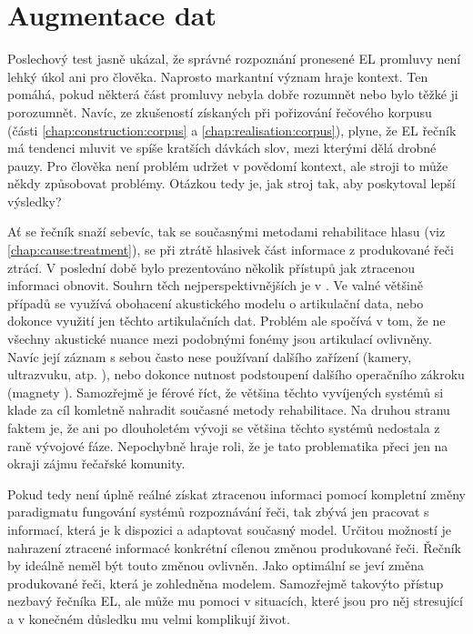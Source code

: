 \section{Augmentace dat}
\label{chap:realisation:augmentation}

Poslechový test jasně ukázal, že správné rozpoznání pronesené EL promluvy není lehký úkol ani pro člověka. Naprosto markantní význam hraje kontext. Ten pomáhá, pokud některá část promluvy nebyla dobře rozumnět nebo bylo těžké ji porozumnět. Navíc, ze zkušeností získaných při pořizování řečového korpusu (části \ref{chap:construction:corpus} a \ref{chap:realisation:corpus}), plyne, že EL řečník má tendenci mluvit ve spíše kratších dávkách slov, mezi kterými dělá drobné pauzy. Pro člověka není problém udržet v povědomí kontext, ale stroji to může někdy způsobovat problémy. Otázkou tedy je, jak  stroj tak, aby poskytoval lepší výsledky?

Ať se řečník snaží sebevíc, tak se současnými metodami rehabilitace hlasu (viz \ref{chap:cause:treatment}), se při ztrátě hlasivek část informace z produkované řeči ztrácí. V poslední době bylo prezentováno několik přístupů jak ztracenou informaci obnovit. Souhrn těch nejperspektivnějších je v \cite{Denby2010}. Ve valné většině případů se využívá obohacení akustického modelu o artikulační data, nebo dokonce využití jen těchto artikulačních dat. \cite{Hofe2013} Problém ale spočívá v tom, že ne všechny akustické nuance mezi podobnými fonémy jsou artikulací ovlivněny. Navíc její záznam s sebou často nese používaní dalšího zařízení (kamery, ultrazvuku, atp. \cite{Hueber2010}), nebo dokonce nutnost podstoupení dalšího operačního zákroku (magnety \cite{Hofe2011}). Samozřejmě je férové říct, že většina těchto vyvíjených systémů si klade za cíl komletně nahradit současné metody rehabilitace. Na druhou stranu faktem je, že ani po dlouholetém vývoji se většina těchto systémů nedostala z raně vývojové fáze. Nepochybně hraje roli, že je tato problematika přeci jen na okraji zájmu řečařské komunity.

Pokud tedy není úplně reálné získat ztracenou informaci pomocí kompletní změny paradigmatu fungování systémů rozpoznávání řeči, tak zbývá jen pracovat s informací, která je k dispozici a adaptovat současný model. Určitou možností je nahrazení ztracené informacé konkrétní cílenou změnou produkované řeči. Řečník by ideálně neměl být touto změnou ovlivněn. Jako optimální se jeví změna produkované řeči, která je zohledněna modelem. Samozřejmě takovýto přístup nezbavý řečníka EL, ale může mu pomoci v situacích, které jsou pro něj stresující a v konečném důsledku mu velmi komplikují život.

